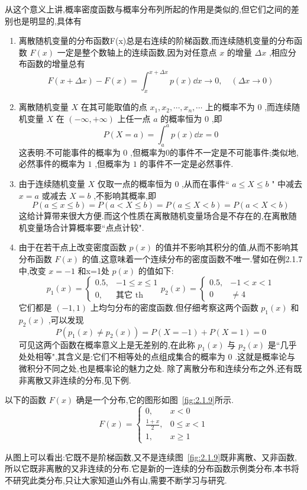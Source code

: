 从这个意义上讲,概率密度函数与概率分布列所起的作用是类似的,但它们之间的差别也是明显的,具体有

\begin{enumerate}
	\item 离散随机变量的分布函数F(x)总是右连续的阶梯函数,而连续随机变量的分布函数 $ F(x) $ 一定是整个数轴上的连续函数,因为对任意点 $ x $ 的增量 $ \Delta x $ ,相应分布函数的增量总有
	\[ 
	F(x+\Delta x)-F(x)=\int_{x}^{x+\Delta x} p(x) \dd x \longrightarrow 0, \quad(\Delta x \rightarrow 0)
	\]
	\item 离散随机变量 $ X $ 在其可能取值的点 $ x_{1}, x_{2}, \cdots, x_{n}, \cdots $ 上的概率不为 $ 0 $ ,而连续随机变量 $ X $ 在 $ (-\infty,+\infty) $ 上任一点 $ a $ 的概率恒为 $ 0 $ ,即
	\[ 
	P(X=a)=\int_{a}^{a} p(x) \dd x=0
	\]
	这表明:不可能事件的概率为 $ 0 $ ,但概率为0的事件不一定是不可能事件;类似地,必然事件的概率为 $ 1 $ ,但概率为 $ 1 $ 的事件不一定是必然事件.
	\item 由于连续随机变量 $ X $ 仅取一点的概率恒为 $ 0 $ ,从而在事件`` $ a \leqslant X \leqslant b $ "
	中减去 $ x=a $ 或减去 $ X=b $ ,不影响其概率,即
	\[ 
	P(a \leqslant x \leqslant b)=P(a<X \leqslant b)=P(a \leqslant X<b)=P(a<X<b)
	\]
	这给计算带来很大方便.而这个性质在离散随机变量场合是不存在的,在离散随机变量场合计算概率要``点点计较".
	\item 由于在若干点上改变密度函数 $ p(x) $ 的值并不影响其积分的值,从而不影响其分布函数 $ F(x) $ 的值,这意味着一个连续分布的密度函数不唯一.譬如在例2.1.7中,改变 $ x=-1 $ 和x=1处 $ p(x) $ 的值如下:
	\[ 
	p_{1}(x)=\left\{\begin{array}{ll}{0.5,} & {-1 \leqslant x \leqslant 1} \\ {0,} & {\text{其它} \text { th }}\end{array}\right. p_{2}(x)=\left\{\begin{array}{ll}{0.5,} & {-1<x<1} \\ {0} & { \neq 4}\end{array}\right.
	\]
	它们都是 $ (-1,1) $ 上均匀分布的密度函数.但仔细考察这两个函数 $ p_1(x) $ 和 $ p_2(x) $ ,可以发现
	\[ 
	P\left(p_{1}(x) \neq p_{2}(x)\right)=P(X=-1)+P(X=1)=0
	\]
	可见这两个函数在概率意义上是无差别的,在此称 $ p_1(x) $ 与 $ p_2(x) $ 是``几乎处处相等",其含义是:它们不相等处的点组成集合的概率为 $ 0 $ .这就是概率论与微积分不同之处,也是概率论的魅力之处.
	除了离散分布和连续分布之外,还有既非离散又非连续的分布,见下例.
\end{enumerate}

\begin{example}\label{exam:2.1.9}
	以下的函数 $ F(x) $ 确是一个分布,它的图形如图~\ref{fig:2.1.9}所示.
	\[ 
	F(x)=\left\{\begin{array}{ll}{0,} & {x<0} \\ {\frac{1+x}{2},} & {0 \leqslant x<1} \\ {1,} & {x \geqslant 1}\end{array}\right.
	\]
	
	从图上可以看出:它既不是阶梯函数,又不是连续图~\ref{fig:2.1.9}既非离散、又非函数,所以它既非离散的又非连续的分布.它是新的一连续的分布函数示例类分布,本书将不研究此类分布,只让大家知道山外有山,需要不断学习与研究.
\end{example}

